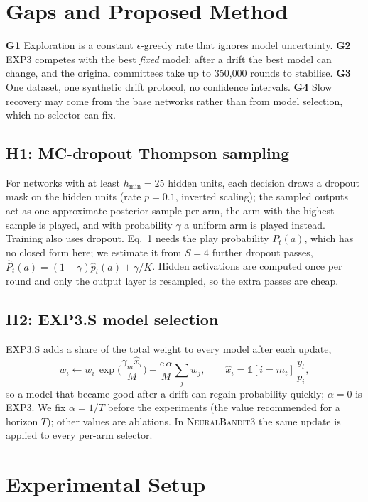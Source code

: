 \documentclass[sigconf]{acmart}
\newcommand{\NB}{\textsc{NeuralBandit}}
\begin{document}
\section{Gaps and Proposed Method}\label{sec:method}
\textbf{G1} Exploration is a constant $\epsilon$-greedy rate that ignores model uncertainty.
\textbf{G2} EXP3 competes with the best \emph{fixed} model; after a drift the best model can change, and the original
committees take up to 350{,}000 rounds to stabilise.
\textbf{G3} One dataset, one synthetic drift protocol, no confidence intervals.
\textbf{G4} Slow recovery may come from the base networks rather than from model selection, which no selector can fix.

\subsection{H1: MC-dropout Thompson sampling}
For networks with at least $h_{\min}=25$ hidden units, each decision draws a dropout mask on the hidden units (rate
$p=0.1$, inverted scaling); the sampled outputs act as one approximate posterior sample per arm, the arm with the
highest sample is played, and with probability $\gamma$ a uniform arm is played instead. Training also uses dropout.
Eq.~1 needs the play probability $P_t(a)$, which has no closed form here; we estimate it from $S=4$ further dropout
passes, $\hat P_t(a)=(1-\gamma)\hat p_t(a)+\gamma/K$. Hidden activations are computed once per round and only the
output layer is resampled, so the extra passes are cheap.

\subsection{H2: EXP3.S model selection}
EXP3.S \cite{auer2002nonstochastic} adds a share of the total weight to every model after each update,
\begin{equation}\label{eq:exp3s}
 w_i\leftarrow w_i\,\exp\!\Big(\frac{\gamma_m\hat x_i}{M}\Big)+\frac{\mathrm{e}\,\alpha}{M}\sum_j w_j,
 \qquad \hat x_i=\mathbb 1[i=m_t]\,\frac{y_t}{p_i},
\end{equation}
so a model that became good after a drift can regain probability quickly; $\alpha=0$ is EXP3. We fix $\alpha=1/T$
before the experiments (the value recommended for a horizon $T$); other values are ablations. In \NB{}3 the same
update is applied to every per-arm selector.

\section{Experimental Setup}
\end{document}
